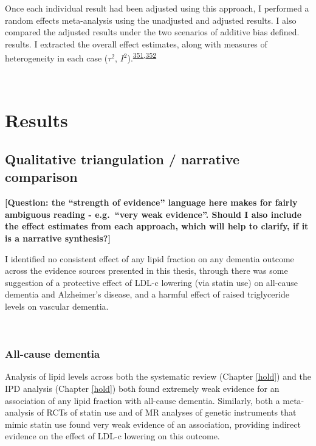 \documentclass[a4paper, twoside]{templates/ociamthesis}
\begin{document}
Once each individual result had been adjusted using this approach, I performed a random effects meta-analysis using the unadjusted and adjusted results. I also compared the adjusted results under the two scenarios of additive bias defined. results. I extracted the overall effect estimates, along with measures of heterogeneity in each case (\(\tau^2\), \(I^2\)).\textsuperscript{\protect\hyperlink{ref-higgins2003}{351},\protect\hyperlink{ref-higgins2008}{352}}

~

\hypertarget{results-2}{%
\section{Results}\label{results-2}}

\hypertarget{qualitative-triangulation-narrative-comparison}{%
\subsection{Qualitative triangulation / narrative comparison}\label{qualitative-triangulation-narrative-comparison}}

\textbf{{[}Question: the ``strength of evidence'' language here makes for fairly ambiguous reading - e.g.~``very weak evidence''. Should I also include the effect estimates from each approach, which will help to clarify, if it is a narrative synthesis?{]}}

I identified no consistent effect of any lipid fraction on any dementia outcome across the evidence sources presented in this thesis, through there was some suggestion of a protective effect of LDL-c lowering (via statin use) on all-cause dementia and Alzheimer's disease, and a harmful effect of raised triglyceride levels on vascular dementia.

~

\hypertarget{all-cause-dementia}{%
\subsubsection{All-cause dementia}\label{all-cause-dementia}}

Analysis of lipid levels across both the systematic review (Chapter \ref{hold}) and the IPD analysis (Chapter \ref{hold}) both found extremely weak evidence for an association of any lipid fraction with all-cause dementia. Similarly, both a meta-analysis of RCTs of statin use and of MR analyses of genetic instruments that mimic statin use found very weak evidence of an association, providing indirect evidence on the effect of LDL-c lowering on this outcome.
\end{document}
